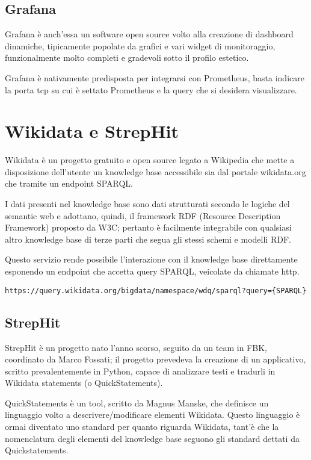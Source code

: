 \subsection{Grafana}
Grafana\cite{grafana} è anch'essa un software open source volto alla creazione di dashboard dinamiche, tipicamente popolate da grafici e vari widget di monitoraggio, 
funzionalmente molto completi e gradevoli sotto il profilo estetico. 

Grafana è nativamente predisposta per integrarsi con Prometheus, basta indicare la porta tcp su cui è settato Prometheus e la query che si desidera visualizzare.   

\section{Wikidata e StrepHit}
Wikidata è un progetto gratuito e open source legato a Wikipedia che mette a disposizione dell'utente un knowledge base accessibile sia dal portale wikidata.org che tramite un endpoint SPARQL.

I dati presenti nel knowledge base sono dati strutturati secondo le logiche del semantic web e adottano, quindi, il framework RDF (Resource Description Framework) proposto da W3C; 
pertanto è facilmente integrabile con qualsiasi altro knowledge base di terze parti che segua gli stessi schemi e modelli RDF.

Questo servizio rende possibile l'interazione con il knowledge base direttamente esponendo un endpoint che accetta query SPARQL, veicolate da chiamate http. 

\begin{lstlisting}[style=YmlStyle, caption=SPARQL endpoint]
    https://query.wikidata.org/bigdata/namespace/wdq/sparql?query={SPARQL}
\end{lstlisting}

\subsection{StrepHit}
StrepHit\cite{strephit} è un progetto nato l'anno scorso, seguito da un team in FBK, coordinato da Marco Fossati; il progetto prevedeva la creazione di un applicativo, scritto prevalentemente 
in Python, capace di analizzare testi e tradurli in Wikidata statements (o QuickStatements\cite{quickstatements}).  

QuickStatements è un tool, scritto da Magnus Manske, che definisce un linguaggio volto a descrivere/modificare elementi Wikidata. Questo linguaggio è ormai diventato uno standard 
per quanto riguarda Wikidata, tant'è che la nomenclatura degli elementi del knowledge base seguono gli standard dettati da Quickstatements.

